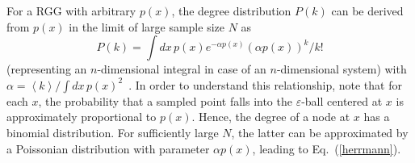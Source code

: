 		For a RGG with arbitrary $p(x)$, the degree distribution $P(k)$ can be derived from $p(x)$ in the limit of large sample size $N$ as
\begin{equation}\label{herrmann}
  P(k) = \int dx\,p(x) e^{-\alpha p(x)}(\alpha p(x))^k/k!
\end{equation}
(representing an $n$-dimensional integral in case of an $n$-dimensional system) with $\alpha = \left<k\right> / \int dx\,p(x)^2$~\cite{Herrmann2003}. In order to understand this relationship, note that for each $x$, the probability that a sampled point falls into the $\varepsilon$-ball centered at $x$ is approximately proportional to $p(x)$. Hence, the degree of a node at $x$ has a binomial distribution. For sufficiently large $N$, the latter can be approximated by a Poissonian distribution with parameter $\alpha p(x)$, leading to Eq.~(\ref{herrmann}).

